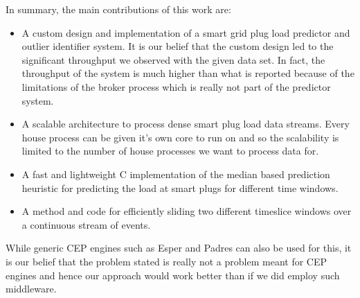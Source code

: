 
In summary, the main contributions of this work are:

\begin{itemize}
\item A custom design and implementation of a smart grid plug load predictor and outlier identifier system.
It is our belief that the custom design led to the significant throughput we observed with the given data set.
In fact, the throughput of the system is much higher than what is reported because of the limitations of the broker process which is really not part of the predictor system.
\item A scalable architecture to process dense smart plug load data streams.
Every house process can be given it's own core to run on and so the scalability is limited to the number of house processes we want to process data for.
\item A fast and lightweight C implementation of the median based prediction heuristic for predicting the load at smart plugs for different time windows.
\item A method and code for efficiently sliding two different timeslice windows over a continuous stream of events.

\end{itemize}

While generic CEP engines such as Esper and Padres can also be used for this, it is our belief that the problem stated is really not a problem meant for CEP engines and hence our approach would work better than if we did employ such middleware.

